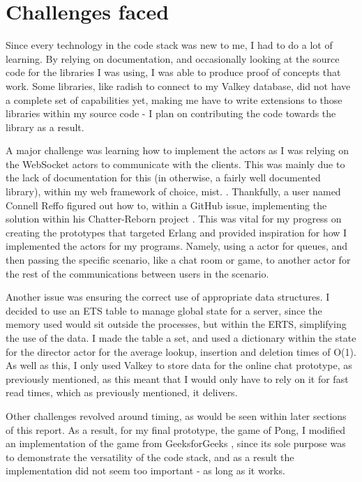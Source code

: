 \documentclass[]{interim}
\begin{document}
\section{Challenges faced}

Since every technology in the code stack was new to me, I had to do a lot of learning.
By relying on documentation, and occasionally looking at the source code for
the libraries I was using, I was able to produce proof of concepts that work.
Some libraries, like radish to connect to my Valkey database, did not have
a complete set of capabilities yet, making me have to write extensions to those
libraries within my source code - I plan on contributing the code towards the
library as a result.

A major challenge was learning how to implement the actors as I was relying on
the WebSocket actors to communicate with the clients. This was mainly due to the
lack of documentation for this (in otherwise, a fairly well documented library),
within my web framework of choice, mist. \cite{noauthor_example_nodate}.
Thankfully, a user named Connell Reffo figured out how to, within a GitHub issue,
implementing the solution within his Chatter-Reborn project \cite{reffo_connellr023/chatter-reborn_2024}.
This was vital for my progress on creating the prototypes that targeted Erlang and
provided inspiration for how I implemented the actors for my programs. Namely,
using a actor for queues, and then passing the specific scenario, like a chat
room or game, to another actor for the rest of the communications
between users in the scenario.

Another issue was ensuring the correct use of appropriate data structures.
I decided to use an ETS table to manage global state for a server, since the
memory used would sit outside the processes, but within the ERTS, simplifying
the use of the data. I made the table a set, and used a dictionary within the
state for the director actor for the average lookup, insertion and deletion
times of O(1). As well as this, I only used Valkey to store data for the
online chat prototype, as previously mentioned, as this meant that I would
only have to rely on it for fast read times, which as previously mentioned,
it delivers.

Other challenges revolved around timing, as would be seen within later sections
of this report. As a result, for my final prototype, the game of Pong, I
modified an implementation of the game from GeeksforGeeks \cite{GeeksforGeeks_pong_2021}, since its sole
purpose was to demonstrate the versatility of the code stack, and as a result
the implementation did not seem too important - as long as it works.
\end{document}
